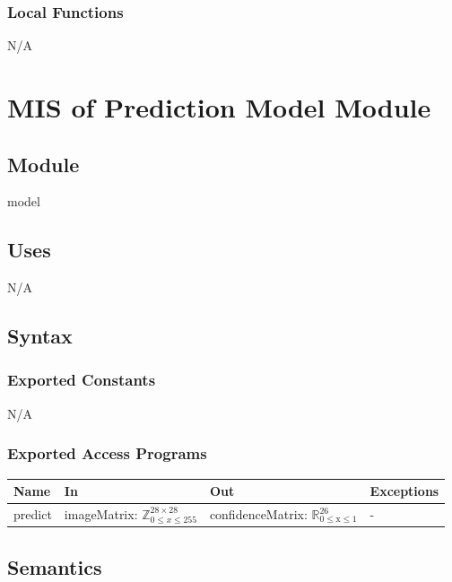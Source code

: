 \documentclass[12pt, titlepage]{article}
\begin{document}
\subsubsection{Local Functions}

N/A


\newpage
\section{MIS of Prediction Model Module} \label{MModel}

\subsection{Module}

model

\subsection{Uses}

N/A


\subsection{Syntax}

\subsubsection{Exported Constants}

N/A

\subsubsection{Exported Access Programs}

\begin{center}
\begin{tabular}{p{2cm} p{4cm} p{4cm} p{2cm}}
\hline
\textbf{Name} & \textbf{In} & \textbf{Out} & \textbf{Exceptions} \\
\hline
predict & imageMatrix: $\mathbb{Z}^{28 \times 28}_{0 \le x \le 255}$ & confidenceMatrix: $\mathbb{R}_{\text{0} \leq \text{x} \leq \text{1}}^{26}$ & - \\
\hline
\end{tabular}
\end{center}

\subsection{Semantics}
\end{document}
